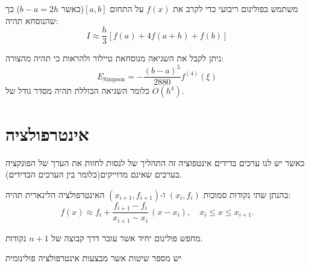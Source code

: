 \documentclass{tstextbook}
\begin{document}
\begin{proposition}
משתמש בפולינום ריבועי כדי לקרב את \(f(x)\) על התחום \([a,b]\)(כאשר \(b-a=2h\)) כך שהנוסחא תהיה:
$$I\approx\frac{h}{3}\left[f(a)+4f(a+h)+f(b)\right]$$

\end{proposition}
\begin{corollary}
ניתן לקבל את השגיאה מנוסחאת טיילור ולהראות כי תהיה מהצורה:
$$E_{\mathrm{Simpson}}=-\frac{(b-a)^{5}}{2880}f^{(4)}(\xi)$$
כלומר השגיאה הכוללת תהיה מסדר גודל של \(O(h^{4})\).

\end{corollary}
\section{אינטרפולציה}

\begin{definition}[אינטרפולציה]
כאשר יש לנו ערכים בדידים אינטפוציה זה התהליך של לנסות לחזות את הערך של הפונקציה בערכים שאינם מדוייקים(כלומר בין הערכים הבדידים).

\end{definition}
\begin{definition}
בהנתן שתי נקודות סמוכות \((x_{i},f_{i})\) ו-\((x_{i+1},f_{i+1})\) האינטרפולציה הלינארית תהיה:
$$f(x)\approx f_{i}+{\frac{f_{i+1}-f_{i}}{x_{i+1}-x_{i}}}\,(x-x_{i}),\quad x_{i}\leq x\leq x_{i+1}.$$

\end{definition}
\begin{definition}
מחפש פולינום יחיד אשר עובר דרך קבוצה של \(n+1\) נקודות.

\end{definition}
יש מספר שיטות אשר מבצעות אינטרפולציה פולינומית
\end{document}
